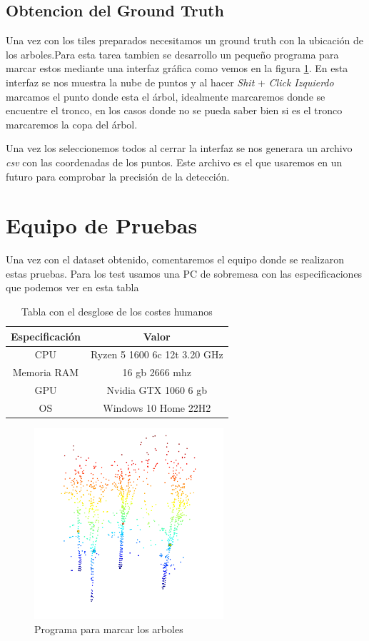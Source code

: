 \subsection{Obtencion del Ground Truth}
Una vez con los tiles preparados necesitamos un ground truth con la ubicación de los arboles.Para esta tarea tambien se desarrollo un pequeño programa para marcar estos mediante una interfaz gráfica como vemos en la figura \ref{fig:labelTile}.
En esta interfaz se nos muestra la nube de puntos y al hacer \textit{Shit} + \textit{Click Izquierdo} marcamos el punto donde esta el árbol, idealmente marcaremos donde se encuentre el tronco, en los casos donde no se pueda saber bien si es el tronco marcaremos la copa del árbol.

Una vez los seleccionemos todos al cerrar la interfaz se nos generara un archivo \textit{csv} con las coordenadas de los puntos. Este archivo es el que usaremos en un futuro para comprobar la precisión de la detección.

\section{Equipo de Pruebas}
Una vez con el dataset obtenido, comentaremos el equipo donde se realizaron estas pruebas. Para los test usamos una PC de sobremesa con las especificaciones que podemos ver en esta tabla 

\begin{table}[h]
\centering
{}
\begin{tabular}{c|c}
\rowcolor{udcpink!25}
\textbf{Especificación} & \textbf{Valor} \\\hline

CPU & Ryzen 5 1600 6c 12t 3.20 GHz\\
Memoria RAM & 16 gb 2666 mhz \\
GPU & Nvidia GTX 1060 6 gb \\
OS & Windows 10 Home 22H2 \\


\end{tabular}
\caption{Tabla con el desglose de los costes humanos}
\label{tabcospes}
\end{table}


\begin{figure}[h]
\centering
    \includegraphics[width=7cm]{imaxes/marking.png}
    \caption{Programa para marcar los arboles}
    \label{fig:labelTile}
\end{figure}

